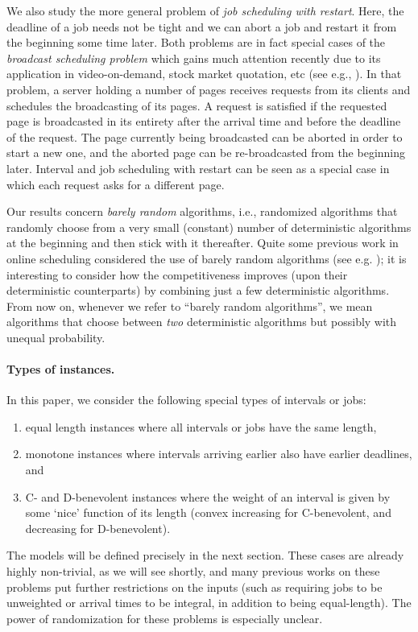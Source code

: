 \documentclass[11pt]{article}
\begin{document}
We also study the more general problem of
{\em job scheduling with restart}.
Here, the deadline of a job needs not be tight and
we can abort a job and restart it from the beginning some time later.
Both problems are in fact special cases of the {\em broadcast
scheduling problem} which gains much attention recently
due to its application in video-on-demand, stock market quotation, etc
(see e.g., \cite{KimChw04,Ting06,ZFCCPW06}).
In that problem, a server holding a number of pages
receives requests from its clients and schedules the
broadcasting of its pages.
A request is satisfied if the requested page is
broadcasted in its entirety after the arrival time and 
before the deadline of the request.
The page currently being broadcasted can be aborted
in order to start a new one,
and the aborted page can be re-broadcasted from the beginning later.
Interval and job scheduling with restart can be seen
as a special case in which each request asks for a different page.

Our results concern {\em barely random} algorithms,
 i.e., randomized algorithms that randomly choose from a very small
(constant) number of deterministic algorithms at the beginning
and then stick with it thereafter.
Quite some previous work in online scheduling considered the use of
barely random algorithms (see e.g. 
\cite{Albers02,CJST07,Sei98});
it is interesting to consider how the competitiveness improves
(upon their deterministic counterparts) 
by combining just a few deterministic algorithms.
From now on, whenever we refer to ``barely random algorithms'',
we mean algorithms that choose between {\em two} deterministic algorithms
but possibly with unequal probability.

\paragraph{Types of instances.}

In this paper, we consider the following special types of intervals or jobs:
\begin{enumerate}
\item
equal length instances where all intervals or jobs have the same
length, 
\item
monotone instances where intervals arriving earlier also have
earlier deadlines, and 
\item
C- and D-benevolent instances where 
the weight of an interval is given by some `nice' function of its length
(convex increasing for C-benevolent, and decreasing for D-benevolent).
\end{enumerate}
The models will be defined precisely in the next section.
These cases are already highly non-trivial, 
as we will see shortly, and many previous works on these
problems put further restrictions on the inputs
(such as requiring jobs to be unweighted
or arrival times to be integral, in addition to being equal-length).
The power of randomization for these problems is
especially unclear.
\end{document}
